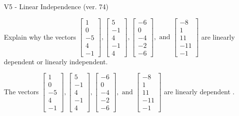 \begin{exercise}
  \begin{exerciseTitle}V5 - Linear Independence (ver. 74)\end{exerciseTitle}
  \begin{exerciseStatement}
    Explain why the vectors \(\left[\begin{array}{r}
1 \\
0 \\
-5 \\
4 \\
-1
\end{array}\right] , \left[\begin{array}{r}
5 \\
-1 \\
4 \\
-1 \\
4
\end{array}\right] , \left[\begin{array}{r}
-6 \\
0 \\
-4 \\
-2 \\
-6
\end{array}\right] , \text{ and } \left[\begin{array}{r}
-8 \\
1 \\
11 \\
-11 \\
-1
\end{array}\right]\) are linearly dependent or linearly independent.	


  \end{exerciseStatement}
  \begin{exerciseAnswer}
   The vectors \(\left[\begin{array}{r}
1 \\
0 \\
-5 \\
4 \\
-1
\end{array}\right] , \left[\begin{array}{r}
5 \\
-1 \\
4 \\
-1 \\
4
\end{array}\right] , \left[\begin{array}{r}
-6 \\
0 \\
-4 \\
-2 \\
-6
\end{array}\right] , \text{ and } \left[\begin{array}{r}
-8 \\
1 \\
11 \\
-11 \\
-1
\end{array}\right]\) are 
  	 linearly dependent  .
  


  \end{exerciseAnswer}
\end{exercise}